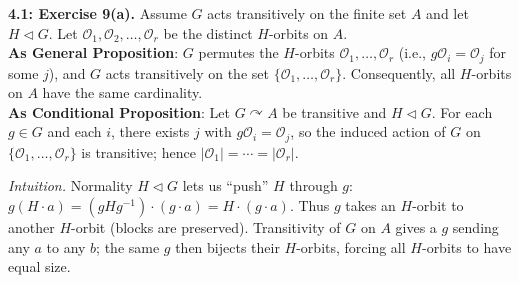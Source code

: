 \documentclass[11pt]{article}
\theoremstyle{definition}
\begin{document}
\newpage

\newpage

\noindent \textbf{4.1: Exercise 9(a).} Assume $G$ acts transitively on the finite set $A$ and let $H\lhd G$. Let $\mathcal O_1,\mathcal O_2,\dots,\mathcal O_r$ be the distinct $H$-orbits on $A$.\\ %

\noindent\textbf{As General Proposition}: $G$ permutes the $H$-orbits $\mathcal O_1,\dots,\mathcal O_r$ (i.e., $g\mathcal O_i=\mathcal O_j$ for some $j$), and $G$ acts transitively on the set $\{\mathcal O_1,\dots,\mathcal O_r\}$. Consequently, all $H$-orbits on $A$ have the same cardinality.\\

\noindent\textbf{As Conditional Proposition}: Let $G\curvearrowright A$ be transitive and $H\lhd G$. For each $g\in G$ and each $i$, there exists $j$ with $g\mathcal O_i=\mathcal O_j$, so the induced action of $G$ on $\{\mathcal O_1,\dots,\mathcal O_r\}$ is transitive; hence $|\mathcal O_1|=\cdots=|\mathcal O_r|$.

\newpage

\dotfill

\emph{Intuition.} Normality $H\lhd G$ lets us “push” $H$ through $g$: $g(H\cdot a)= (gHg^{-1})\cdot (g\cdot a)=H\cdot(g\cdot a)$. Thus $g$ takes an $H$-orbit to another $H$-orbit (blocks are preserved). Transitivity of $G$ on $A$ gives a $g$ sending any $a$ to any $b$; the same $g$ then bijects their $H$-orbits, forcing all $H$-orbits to have equal size.\\

\dotfill
\end{document}
